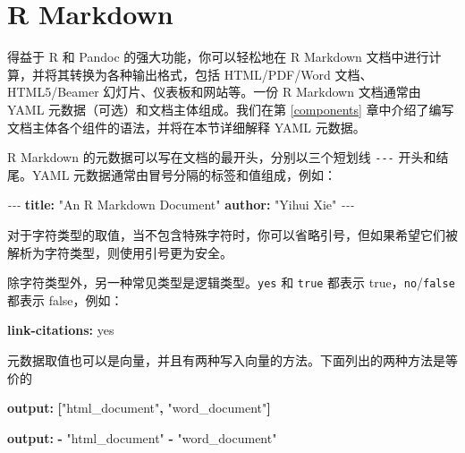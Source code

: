 \documentclass[
  12pt,
]{krantz}
\newenvironment{Shaded}{\begin{snugshade}}{\end{snugshade}}
\newcommand{\AttributeTok}[1]{\textcolor[rgb]{0.13,0.29,0.53}{#1}}
\newcommand{\CharTok}[1]{\textcolor[rgb]{0.31,0.60,0.02}{#1}}
\newcommand{\FunctionTok}[1]{\textcolor[rgb]{0.13,0.29,0.53}{\textbf{#1}}}
\newcommand{\KeywordTok}[1]{\textcolor[rgb]{0.13,0.29,0.53}{\textbf{#1}}}
\newcommand{\PreprocessorTok}[1]{\textcolor[rgb]{0.56,0.35,0.01}{\textit{#1}}}
\newcommand{\StringTok}[1]{\textcolor[rgb]{0.31,0.60,0.02}{#1}}
\theoremstyle{definition}
\theoremstyle{definition}
\theoremstyle{definition}
\theoremstyle{definition}
\theoremstyle{remark}
\begin{document}
\section{R Markdown}\label{r-markdown}

得益于 R 和 Pandoc 的强大功能，你可以轻松地在 R Markdown 文档中进行计算，并将其转换为各种输出格式，包括 HTML/PDF/Word 文档、HTML5/Beamer 幻灯片、仪表板和网站等。一份 R Markdown 文档通常由 YAML 元数据（可选）和文档主体组成。我们在第 \ref{components} 章中介绍了编写文档主体各个组件的语法，并将在本节详细解释 YAML 元数据。

R Markdown 的元数据可以写在文档的最开头，分别以三个短划线 \texttt{-\/-\/-} 开头和结尾。YAML 元数据通常由冒号分隔的标签和值组成，例如：

\begin{Shaded}
\begin{Highlighting}[]
\PreprocessorTok{{-}{-}{-}}
\FunctionTok{title}\KeywordTok{:}\AttributeTok{ }\StringTok{"An R Markdown Document"}
\FunctionTok{author}\KeywordTok{:}\AttributeTok{ }\StringTok{"Yihui Xie"}
\PreprocessorTok{{-}{-}{-}}
\end{Highlighting}
\end{Shaded}

对于字符类型的取值，当不包含特殊字符时，你可以省略引号，但如果希望它们被解析为字符类型，则使用引号更为安全。

除字符类型外，另一种常见类型是逻辑类型。\texttt{yes} 和 \texttt{true} 都表示 true，\texttt{no}/\texttt{false} 都表示 false，例如：

\begin{Shaded}
\begin{Highlighting}[]
\FunctionTok{link{-}citations}\KeywordTok{:}\AttributeTok{ }\CharTok{yes}
\end{Highlighting}
\end{Shaded}

元数据取值也可以是向量，并且有两种写入向量的方法。下面列出的两种方法是等价的

\begin{Shaded}
\begin{Highlighting}[]
\FunctionTok{output}\KeywordTok{:}\AttributeTok{ }\KeywordTok{[}\StringTok{"html\_document"}\KeywordTok{,}\AttributeTok{ }\StringTok{"word\_document"}\KeywordTok{]}
\end{Highlighting}
\end{Shaded}

\begin{Shaded}
\begin{Highlighting}[]
\FunctionTok{output}\KeywordTok{:}
\AttributeTok{  }\KeywordTok{{-}}\AttributeTok{ }\StringTok{"html\_document"}
\AttributeTok{  }\KeywordTok{{-}}\AttributeTok{ }\StringTok{"word\_document"}
\end{Highlighting}
\end{Shaded}
\end{document}
